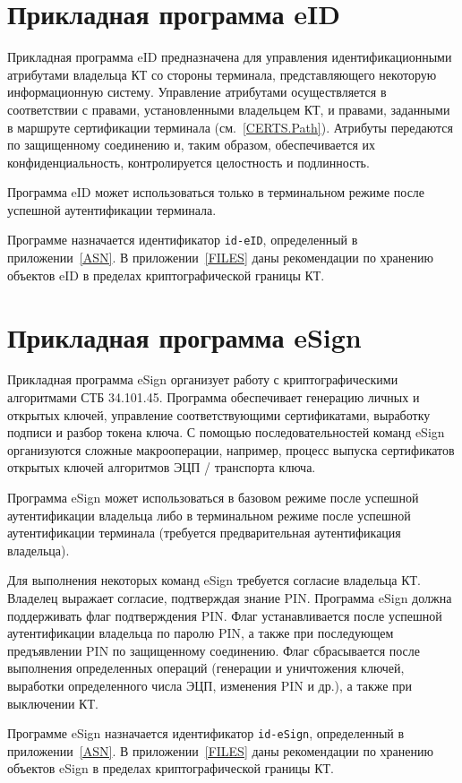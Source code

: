 \section{Прикладная программа eID}\label{OBJ.eID}

Прикладная программа eID предназначена для управления идентификационными
атрибутами владельца КТ со стороны терминала, представляющего некоторую
информационную систему.
%
Управление атрибутами осуществляется в соответствии с правами,
установленными владельцем КТ, и правами, заданными в маршруте сертификации
терминала (см.~\ref{CERTS.Path}).
%
Атрибуты передаются по защищенному соединению и, таким образом, обеспечивается 
их конфиденциальность, контролируется целостность и подлинность. 

Программа eID может использоваться только в терминальном режиме
после успешной аутентификации терминала. 

Программе назначается идентификатор \verb|id-eID|, определенный в
приложении~\ref{ASN}. В приложении~\ref{FILES} даны рекомендации по хранению
объектов eID в пределах криптографической границы КТ.

\section{Прикладная программа eSign}\label{OBJ.eSign}

Прикладная программа eSign организует работу с криптографическими 
алгоритмами СТБ 34.101.45. 
%
Программа обеспечивает генерацию личных и открытых 
ключей, управление соответствующими сертификатами, 
выработку подписи и разбор токена ключа.
%
С помощью последовательностей команд eSign организуются сложные макрооперации,  
например, процесс выпуска сертификатов открытых ключей алгоритмов ЭЦП / 
транспорта ключа. 

Программа eSign может использоваться в базовом режиме 
после успешной аутентификации владельца либо в терминальном режиме 
после успешной аутентификации терминала (требуется предварительная 
аутентификация владельца). 

Для выполнения некоторых команд eSign требуется согласие владельца КТ. 
Владелец выражает согласие, подтверждая знание PIN. Программа eSign должна 
поддерживать флаг подтверждения PIN.
%
Флаг устанавливается после успешной аутентификации владельца по паролю PIN, а 
также при последующем предъявлении PIN по защищенному соединению.  
%
Флаг сбрасывается после выполнения определенных операций 
(генерации и уничтожения ключей, выработки определенного 
числа ЭЦП, изменения PIN и др.), а также при выключении КТ.

Программе eSign назначается идентификатор \verb|id-eSign|, 
определенный в приложении~\ref{ASN}. В приложении~\ref{FILES}
даны рекомендации по хранению объектов eSign в пределах криптографической 
границы КТ.




